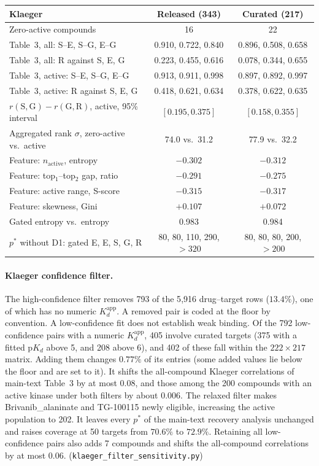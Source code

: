 \documentclass[11pt]{article}
\begin{document}
\begin{table}[h]
\vspace{1em}
\begin{tabular}{lcc}
\toprule
Klaeger & Released (343) & Curated (217) \\
\midrule
Zero-active compounds & 16 & 22 \\
Table~3, all: S--E, S--G, E--G & 0.910, 0.722, 0.840 & 0.896, 0.508, 0.658 \\
Table~3, all: R against S, E, G & 0.223, 0.455, 0.616 & 0.078, 0.344, 0.655 \\
Table~3, active: S--E, S--G, E--G & 0.913, 0.911, 0.998 & 0.897, 0.892, 0.997 \\
Table~3, active: R against S, E, G & 0.418, 0.621, 0.634 & 0.378, 0.622, 0.635 \\
$r(\mathrm{S,G}) - r(\mathrm{G,R})$, active, 95\% interval & $[0.195, 0.375]$ & $[0.158, 0.355]$ \\
Aggregated rank $\sigma$, zero-active vs.\ active & 74.0 vs.\ 31.2 & 77.9 vs.\ 32.2 \\
Feature: $n_\mathrm{active}$, entropy & $-0.302$ & $-0.312$ \\
Feature: top$_1$--top$_2$ gap, ratio & $-0.291$ & $-0.275$ \\
Feature: active range, S-score & $-0.315$ & $-0.317$ \\
Feature: skewness, Gini & $+0.107$ & $+0.072$ \\
Gated entropy vs.\ entropy & 0.983 & 0.984 \\
$p^*$ without D1: gated E, E, S, G, R & 80, 80, 110, 290, $>320$ & 80, 80, 80, 200, $>200$ \\
\bottomrule
\end{tabular}
\end{table}

\paragraph{Klaeger confidence filter.} The high-confidence filter removes 793 of
the 5{,}916 drug--target rows ($13.4\%$), one of which has no numeric
$K_d^\mathrm{app}$. A removed pair is coded at the floor by convention. A
low-confidence fit does not establish weak binding. Of the 792 low-confidence
pairs with a numeric $K_d^\mathrm{app}$, 405 involve curated targets (375 with
a fitted $\mathrm{p}K_d$ above 5, and 208 above 6), and 402 of these fall within
the $222 \times 217$ matrix. Adding them changes $0.77\%$ of its entries (some
added values lie below the floor and are set to it). It shifts the all-compound
Klaeger correlations of main-text Table~3 by at most $0.08$, and those among the
200 compounds with an active kinase under both filters by about $0.006$.
The relaxed filter makes Brivanib\_alaninate and TG-100115 newly eligible,
increasing the active population to 202. It
leaves every $p^*$ of the main-text recovery analysis unchanged and raises coverage
at 50 targets from $70.6\%$ to $72.9\%$. Retaining all low-confidence pairs also
adds 7 compounds and shifts the all-compound correlations by at most $0.06$.
(\texttt{klaeger\_filter\_sensitivity.py})
\end{document}
